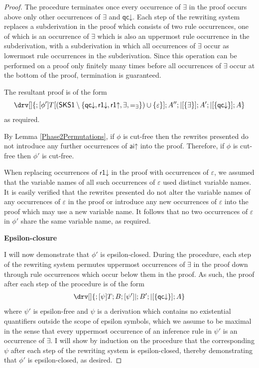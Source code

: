\documentclass[10pt]{article}
\theoremstyle{definition}\newtheorem{remark}[theorem]{Remark}
\theoremstyle{definition}\newtheorem{example}[theorem]{Example}
\theoremstyle{definition}\newtheorem{definition}[theorem]{Definition}
\newcommand{\SKSqDecomp}{{\mathsf{SKS1}}}
\newcommand{\aiUp}{{\mathsf{ai\mathord\uparrow}}}
\newcommand{\qcDown}{{\mathsf{qc\mathord\downarrow}}}
\newcommand{\rOneUp}{{\mathsf{r1\mathord\uparrow}}}
\newcommand{\rOneDown}{{\mathsf{r1\mathord\downarrow}}}
\newcommand{\falsifierRule}{{\mathsf{\varepsilon}}}
\newcommand{\eqExists}{=_{\exists}}
\begin{document}
\begin{proof}
		The procedure terminates once every occurrence of $\exists$ in the proof occurs above only other occurrences of $\exists$ and $\qcDown$. Each step of the rewriting system replaces a subderivation in the proof which consists of two rule occurrences, one of which is an occurrence of $\exists$ which is also an uppermost rule occurrence in the subderivation, with a subderivation in which all occurrences of $\exists$ occur as lowermost rule occurrences in the subderivation. Since this operation can be performed on a proof only finitely many times before all occurrences of $\exists$ occur at the bottom of the proof, termination is guaranteed.
		
		The resultant proof is of the form
		\[
		\drv[] {
			; [\phi']T[(\SKSqDecomp \setminus \{\qcDown, \rOneDown, \rOneUp, \exists, \eqExists\}) \cup \{\varepsilon\}] ; A'' ; |[\{\exists\}] ; A' ; |[\{\qcDown\}] ; A
		}
		\]
		as required.
		
		By Lemma \ref{Phase2Permutations}, if $\phi$ is cut-free then the rewrites presented do not introduce any further occurrences of $\aiUp$ into the proof. Therefore, if $\phi$ is cut-free then $\phi'$ is cut-free.
		
		When replacing occurrences of $\rOneDown$ in the proof with occurrences of $\falsifierRule$, we assumed that the variable names of all such occurrences of $\falsifierRule$ used distinct variable names. It is easily verified that the rewrites presented do not alter the variable names of any occurrences of $\falsifierRule$ in the proof or introduce any new occurrences of $\falsifierRule$ into the proof which may use a new variable name. It follows that no two occurrences of $\falsifierRule$ in $\phi'$ share the same variable name, as required.
		
		\noindent
		\textbf{Epsilon-closure}
		
		I will now demonstrate that $\phi'$ is epsilon-closed. During the procedure, each step of the rewriting system permutes uppermost occurrences of $\exists$ in the proof down through rule occurrences which occur below them in the proof. As such, the proof after each step of the procedure is of the form
		\begin{gather}\label{Phase2EpsilonClosedForm}
			\drv[] {
				; [\psi]T ; B ; [\psi']| ; B' ; |[\{\qcDown\}] ; A
			}
		\end{gather}
		where $\psi'$ is epsilon-free and $\psi$ is a derivation which contains no existential quantifiers outside the scope of epsilon symbols, which we assume to be maximal in the sense that every uppermost occurrence of an inference rule in $\psi'$ is an occurrence of $\exists$. I will show by induction on the procedure that the corresponding $\psi$ after each step of the rewriting system is epsilon-closed, thereby demonstrating that $\phi'$ is epsilon-closed, as desired.
		

\end{proof}
\end{document}
